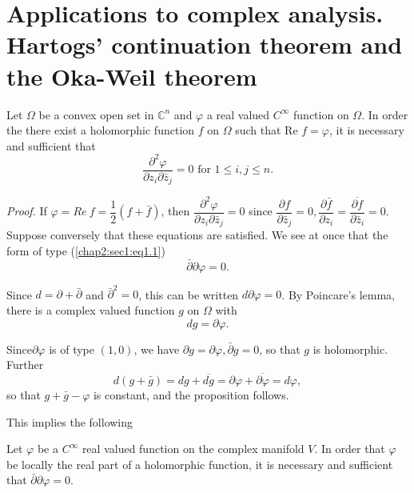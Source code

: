 \section[Applications to complex analysis...]{Applications to 
complex analysis. Hartogs' continuation
  theorem and the Oka-Weil theorem}\label{chap2:sec8} %

\setcounter{proposition}{0}
\begin{proposition}\label{chap2:sec8:prop1}%
  Let $\Omega$ be a convex open set in $\mathbb{C}^n$ and $\varphi$ a
  real valued $C^\infty$ function on $\Omega$. In order the there
  exist a holomorphic function $f$ on $\Omega$ such that Re $f =
  \varphi$, it is necessary and sufficient that 
  $$
  \frac{\partial^2 \varphi}{\partial z_i \partial \bar{z}_j} = 0
  \text{ for } 1 \leq i, j \leq n. 
  $$
\end{proposition}

\noindent \textit{Proof.}
  If $\varphi = Re \ f = \dfrac{1}{2} (f + \bar{f})$, then
  $\dfrac{\partial^2 \varphi}{\partial z_i \partial \bar{z}_j} = 0$
  since $\dfrac{\partial f}{\partial \bar{z}_j} = 0, \dfrac{\partial
    \bar{f}}{\partial z_i} = \dfrac{\overline{\partial f}} {\partial
    \bar{z}_i} = 0$. Suppose conversely that these equations are
  satisfied. We see at once that the form of type (\ref{chap2:sec1:eq1.1}) 
  \begin{equation*}
    \bar{\partial} \partial \varphi = 0.
  \end{equation*}

Since $d = \partial + \bar{\partial}$ and $\bar{\partial}^2 =0$, this
can be written $d \partial \varphi = 0$. By Poincare's lemma, there is
a complex valued function $g$ on $\Omega$ with  
$$
dg = \partial \varphi.
$$

Since\pageoriginale $\partial \varphi$ is of type $(1,0)$, we have $\partial g =
\partial \varphi, \bar{\partial} g = 0$, so that $g$ is
holomorphic. Further 
$$
d(g + \bar{g}) = dg + \overline{dg} = \partial \varphi +
\overline{\partial \varphi} = d \varphi, 
$$
so that $g + \bar{g} - \varphi$ is constant, and the proposition follows.

This implies the following

\begin{prop*}[{\boldmath $1'$}]\label{chap2:sec8:prop'}%
  Let $\varphi$ be a $C^\infty$ real valued function on the complex
  manifold $V$. In order that $\varphi$ be locally the real part of a
  holomorphic function, it is necessary and sufficient that
  $\bar{\partial} \partial \varphi = 0$.  
\end{prop*}

